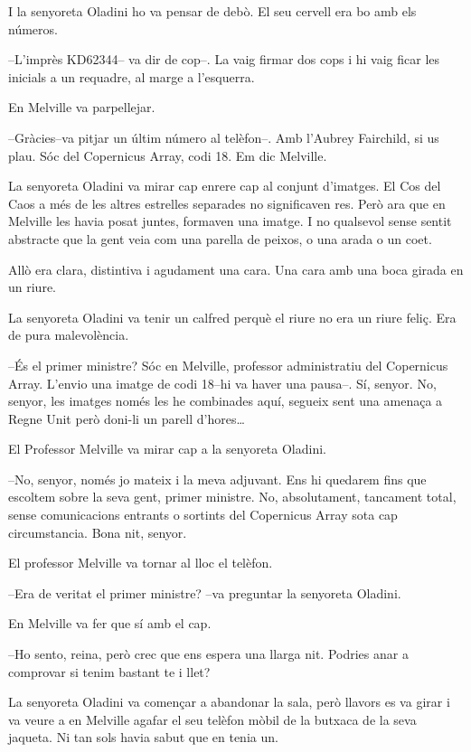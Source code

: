 I la senyoreta Oladini ho va pensar de debò. El seu cervell era bo amb
els números.

--L'imprès KD62344-- va dir de cop--. La vaig firmar dos cops i hi vaig
ficar les inicials a un requadre, al marge a l'esquerra.

En Melville va parpellejar.

--Gràcies--va pitjar un últim número al telèfon--. Amb l'Aubrey
Fairchild, si us plau. Sóc del Copernicus Array, codi 18. Em dic
Melville.

La senyoreta Oladini va mirar cap enrere cap al conjunt d'imatges. El
Cos del Caos a més de les altres estrelles separades no significaven
res. Però ara que en Melville les havia posat juntes, formaven una
imatge. I no qualsevol sense sentit abstracte que la gent veia com una
parella de peixos, o una arada o un coet.

Allò era clara, distintiva i agudament una cara. Una cara amb una boca
girada en un riure.

La senyoreta Oladini va tenir un calfred perquè el riure no era un riure
feliç. Era de pura malevolència.

--És el primer ministre? Sóc en Melville, professor administratiu del
Copernicus Array. L'envio una imatge de codi 18--hi va haver una
pausa--. Sí, senyor. No, senyor, les imatges només les he combinades
aquí, segueix sent una amenaça a Regne Unit però doni-li un parell
d'hores\ldots{}

El Professor Melville va mirar cap a la senyoreta Oladini.

--No, senyor, només jo mateix i la meva adjuvant. Ens hi quedarem fins
que escoltem sobre la seva gent, primer ministre. No, absolutament,
tancament total, sense comunicacions entrants o sortints del Copernicus
Array sota cap circumstancia. Bona nit, senyor.

El professor Melville va tornar al lloc el telèfon.

--Era de veritat el primer ministre? --va preguntar la senyoreta
Oladini.

En Melville va fer que sí amb el cap.

--Ho sento, reina, però crec que ens espera una llarga nit. Podries anar
a comprovar si tenim bastant te i llet?

La senyoreta Oladini va començar a abandonar la sala, però llavors es va
girar i va veure a en Melville agafar el seu telèfon mòbil de la butxaca
de la seva jaqueta. Ni tan sols havia sabut que en tenia un.

